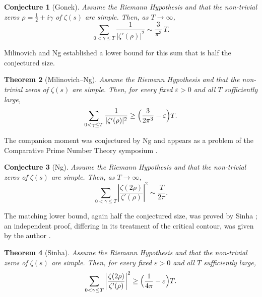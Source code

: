 \documentclass[10pt,a4paper]{amsart}
\newtheorem{theorem}{Theorem}
\newtheorem{conjecture}[theorem]{Conjecture}
\numberwithin{equation}{section}
\begin{document}
\begin{conjecture}[Gonek]\label{conj:gonek}
Assume the Riemann Hypothesis and that the non-trivial zeros $\rho=\tfrac12+i\gamma$ of $\zeta(s)$ are simple. Then, as $T\to\infty$,
\[
\sum_{0<\gamma\le T}\frac{1}{|\zeta'(\rho)|^2}\sim\frac{3}{\pi^3}\,T.
\]
\end{conjecture}

Milinovich and Ng \cite{MilinovichNg} established a lower bound for this sum that is half the conjectured size.

\begin{theorem}[Milinovich--Ng]\label{thm:MNzeta}
Assume the Riemann Hypothesis and that the non-trivial zeros of $\zeta(s)$ are simple. Then, for every fixed $\varepsilon>0$ and all $T$ sufficiently large,
\[
\sum_{0<\gamma\le T}\frac{1}{|\zeta'(\rho)|^2}\ge\Bigl(\frac{3}{2\pi^3}-\varepsilon\Bigr)T.
\]
\end{theorem}

The companion moment was conjectured by Ng \cite{NgThesis,NgPNET} and appears as a problem of the Comparative Prime Number Theory symposium \cite{CPNT}.

\begin{conjecture}[Ng]\label{conj:ng}
Assume the Riemann Hypothesis and that the non-trivial zeros of $\zeta(s)$ are simple. Then, as $T\to\infty$,
\[
\sum_{0<\gamma\le T}\left|\frac{\zeta(2\rho)}{\zeta'(\rho)}\right|^2\sim\frac{T}{2\pi}.
\]
\end{conjecture}

The matching lower bound, again half the conjectured size, was proved by Sinha \cite{SinhaThesis}; an independent proof, differing in its treatment of the critical contour, was given by the author \cite{PCNg}.

\begin{theorem}[Sinha]\label{thm:Sinha}
Assume the Riemann Hypothesis and that the non-trivial zeros of $\zeta(s)$ are simple. Then, for every fixed $\varepsilon>0$ and all $T$ sufficiently large,
\[
\sum_{0<\gamma\le T}\left|\frac{\zeta(2\rho)}{\zeta'(\rho)}\right|^2\ge\Bigl(\frac{1}{4\pi}-\varepsilon\Bigr)T.
\]
\end{theorem}
\end{document}
